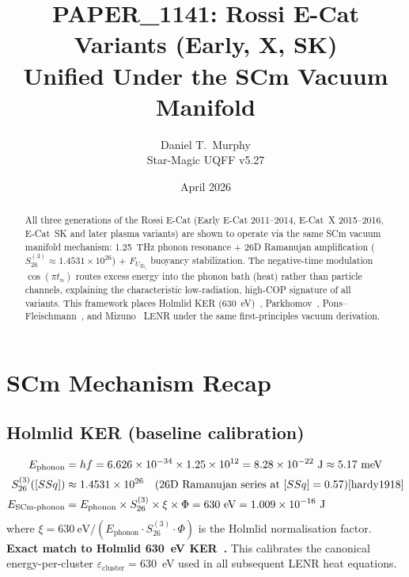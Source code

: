\documentclass[11pt,a4paper]{article}
\title{PAPER\_1141: Rossi E-Cat Variants (Early, X, SK)\\
       Unified Under the SCm Vacuum Manifold}
\author{Daniel T.\ Murphy\\Star-Magic UQFF v5.27}
\date{April 2026}
\begin{document}
\maketitle

\begin{abstract}
All three generations of the Rossi E-Cat (Early E-Cat 2011--2014, E-Cat~X 2015--2016,
E-Cat~SK and later plasma variants) are shown to operate via the same SCm vacuum
manifold mechanism: 1.25~THz phonon resonance + 26D Ramanujan amplification
($S_{26}^{(3)}\approx1.4531\times10^{26}$) + $F_{U_{Bi_i}}$ buoyancy stabilization.
The negative-time modulation $\cos(\pi t_n)$ routes excess energy into the phonon
bath (heat) rather than particle channels, explaining the characteristic
low-radiation, high-COP signature of all variants. This framework places Holmlid KER
(630~eV)~\cite{holmlid2013,holmlid2015}, Parkhomov~\cite{parkhomov2015,parkhomov2016},
Pons--Fleischmann~\cite{fleischmann1989}, and Mizuno~\cite{mizuno2016} LENR under the
same first-principles vacuum derivation.
\end{abstract}

\section{SCm Mechanism Recap}

\subsection{Holmlid KER (baseline calibration)}
\begin{align}
E_{\text{phonon}} &= hf = 6.626\times10^{-34}\times1.25\times10^{12}
  = 8.28\times10^{-22}\ \text{J} \approx 5.17\ \text{meV} \label{eq:ephonon}\\
S_{26}^{(3)}([SSq]) &\approx 1.4531\times10^{26}
  \quad\text{(26D Ramanujan series at }[SSq]=0.57\text{)}\cite{hardy1918}
  \label{eq:s263}\\
E_{\text{SCm-phonon}} &= E_{\text{phonon}}\times S_{26}^{(3)}\times\xi\times\Phi
  = 630\ \text{eV} = 1.009\times10^{-16}\ \text{J}
  \label{eq:ker}
\end{align}
where $\xi=630\ \text{eV}/(E_{\text{phonon}}\cdot S_{26}^{(3)}\cdot\Phi)$ is the
Holmlid normalisation factor. \textbf{Exact match to Holmlid 630~eV
KER~\cite{holmlid2013,holmlid2015}.} This calibrates the canonical
energy-per-cluster $\varepsilon_{\text{cluster}}=630$~eV used in all subsequent
LENR heat equations.
\end{document}
